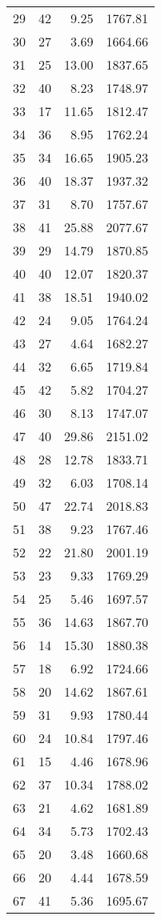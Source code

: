 \begin{appendix}
\begin{compacttable}
\begin{longtable}{@{}rrrr@{}}
29 & 42 & 9.25 & 1767.81 \\
30 & 27 & 3.69 & 1664.66 \\
31 & 25 & 13.00 & 1837.65 \\
32 & 40 & 8.23 & 1748.97 \\
33 & 17 & 11.65 & 1812.47 \\
34 & 36 & 8.95 & 1762.24 \\
35 & 34 & 16.65 & 1905.23 \\
36 & 40 & 18.37 & 1937.32 \\
37 & 31 & 8.70 & 1757.67 \\
38 & 41 & 25.88 & 2077.67 \\
39 & 29 & 14.79 & 1870.85 \\
40 & 40 & 12.07 & 1820.37 \\
41 & 38 & 18.51 & 1940.02 \\
42 & 24 & 9.05 & 1764.24 \\
43 & 27 & 4.64 & 1682.27 \\
44 & 32 & 6.65 & 1719.84 \\
45 & 42 & 5.82 & 1704.27 \\
46 & 30 & 8.13 & 1747.07 \\
47 & 40 & 29.86 & 2151.02 \\
48 & 28 & 12.78 & 1833.71 \\
49 & 32 & 6.03 & 1708.14 \\
50 & 47 & 22.74 & 2018.83 \\
51 & 38 & 9.23 & 1767.46 \\
52 & 22 & 21.80 & 2001.19 \\
53 & 23 & 9.33 & 1769.29 \\
54 & 25 & 5.46 & 1697.57 \\
55 & 36 & 14.63 & 1867.70 \\
56 & 14 & 15.30 & 1880.38 \\
57 & 18 & 6.92 & 1724.66 \\
58 & 20 & 14.62 & 1867.61 \\
59 & 31 & 9.93 & 1780.44 \\
60 & 24 & 10.84 & 1797.46 \\
61 & 15 & 4.46 & 1678.96 \\
62 & 37 & 10.34 & 1788.02 \\
63 & 21 & 4.62 & 1681.89 \\
64 & 34 & 5.73 & 1702.43 \\
65 & 20 & 3.48 & 1660.68 \\
66 & 20 & 4.44 & 1678.59 \\
67 & 41 & 5.36 & 1695.67 \\
\end{longtable}
\end{compacttable}


\end{appendix}
